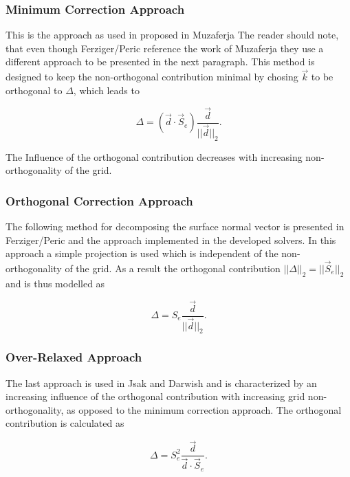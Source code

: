       \subsubsection{Minimum Correction Approach}

      This is the approach as used in proposed in Muzaferja The reader should note, that even though Ferziger/Peric reference the work of Muzaferja they use a different approach to be presented in the next paragraph. This method is designed to keep the non-orthogonal contribution minimal by chosing \(\vec{k}\) to be orthogonal to \(\Delta\), which leads to

      \begin{displaymath}
        \Delta = \left( \vec{d} \cdot \vec{S}_e \right) \frac{\vec{d}}{||\vec{d}||_2}.
      \end{displaymath}

      The Influence of the orthogonal contribution decreases with increasing non-orthogonality of the grid.

      \subsubsection{Orthogonal Correction Approach}

    The following method for decomposing the surface normal vector is presented in Ferziger/Peric and the approach implemented in the developed solvers. In this approach a simple projection is used which is independent of the non-orthogonality of the grid. As a result the orthogonal contribution \(||\Delta||_2 =  ||\vec{S}_e||_2\) and is thus modelled as 

      \begin{displaymath}
        \Delta =  S_e \frac{\vec{d}}{ ||\vec{d}||_2}.
      \end{displaymath}

      \subsubsection{Over-Relaxed Approach}

      The last approach is used in Jsak and Darwish and is characterized by an increasing influence of the orthogonal contribution with increasing grid non-orthogonality, as opposed to the minimum correction approach. The orthogonal contribution is calculated as

      \begin{displaymath}
        \Delta =  S_e^2 \frac{\vec{d}}{ \vec{d} \cdot \vec{S}_e }.
      \end{displaymath} 

